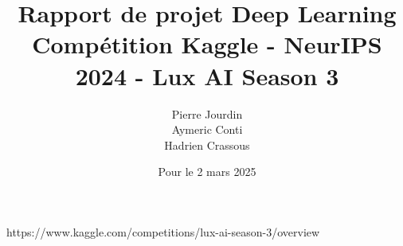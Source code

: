 \documentclass[12pt,a4paper]{article}
\title{Rapport de projet Deep Learning
\\ \large Compétition Kaggle - NeurIPS 2024 - Lux AI Season 3
}
\author{Pierre Jourdin \\ Aymeric Conti \\ Hadrien Crassous}
\date{Pour le 2 mars 2025}
\begin{document}
\maketitle

\tableofcontents

https://www.kaggle.com/competitions/lux-ai-season-3/overview
\end{document}
